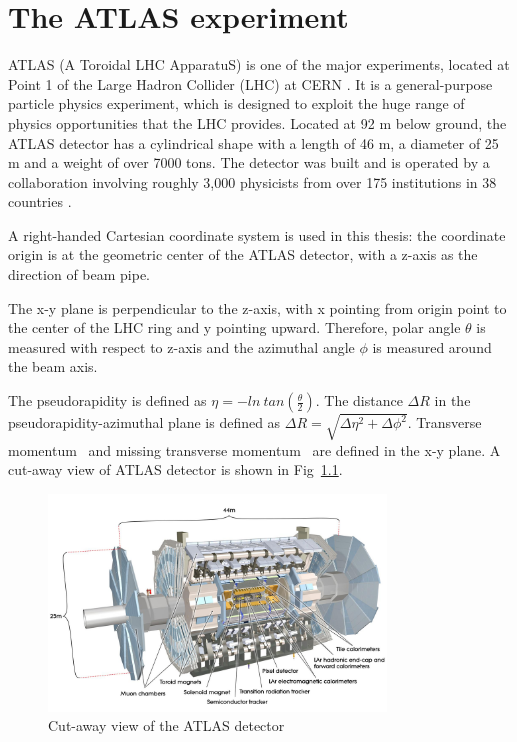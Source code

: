 \chapter{The ATLAS experiment}

\label{ch:atlas}
\par ATLAS (A Toroidal LHC ApparatuS) is one of the major experiments, located at Point 1 of the Large Hadron Collider (LHC) at CERN \cite{Aad:2008zzm}. It is a general-purpose particle physics experiment, which is designed to exploit the huge range of physics opportunities that the LHC provides. Located at 92 m below ground, the ATLAS detector has a cylindrical shape with a length of 46 m, a diameter of 25 m and a weight of over 7000 tons.
 The detector was built and is operated by a collaboration involving roughly 3,000 physicists from over 175 institutions in 38 countries \cite{fact}.

\par A right-handed Cartesian coordinate system is used in this thesis: the coordinate origin is at the geometric center of the ATLAS detector, with a z-axis as the direction of beam pipe.

\par The x-y plane is perpendicular to the z-axis, with x pointing from origin point to the center of the LHC ring and y pointing upward. Therefore, polar angle $\theta$ is measured with respect to z-axis and the azimuthal angle $\phi$ is measured around the beam axis. 

\par The pseudorapidity is defined as $\eta = -ln~tan(\frac{\theta}{2})$. The distance $\Delta R$ in the pseudorapidity-azimuthal plane is defined as $\Delta R = \sqrt{\Delta\eta^2 + \Delta\phi^2}$. Transverse momentum \pt~and missing transverse momentum \met~are defined in the x-y plane. A cut-away view of ATLAS detector is shown in Fig~\ref{fig:cutaway}.

\begin{figure}[htbp]
 \begin{center}
 \includegraphics[width=0.8\textwidth]{chapters/c4/figures/atlas.jpg}
 \end{center}
 \caption{Cut-away view of the ATLAS detector}
 \label{fig:cutaway}
\end{figure}

